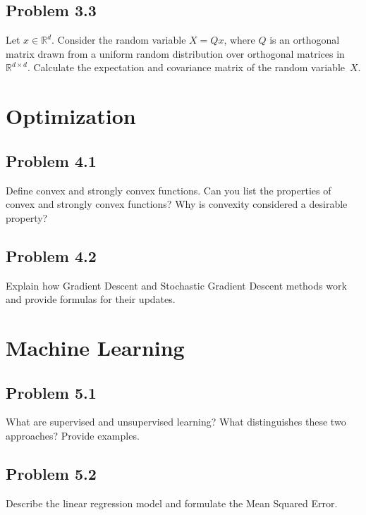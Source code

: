\documentclass{article}
\begin{document}
	\vspace{40 pt}
	
	
	\subsection*{Problem 3.3}
	
	Let $x \in \mathbb{R}^d$. Consider the random variable $X = Qx$, where $Q$ is an orthogonal matrix drawn from a uniform random distribution over orthogonal matrices in $\mathbb{R}^{d\times d} $. Calculate the expectation and covariance matrix of the random variable~$X$.
	
	\vspace{40 pt}
	
	\section{Optimization}
	
	\subsection*{Problem 4.1}
	Define convex and strongly convex functions. Can you list the properties of convex and strongly convex functions? Why is convexity considered a desirable property?
	
	\vspace{40 pt}
	
	\subsection*{Problem 4.2}
	Explain how Gradient Descent and Stochastic Gradient Descent methods work and provide formulas for their updates.
	
	\section{Machine Learning}
	\subsection*{Problem 5.1}
	What are supervised and unsupervised learning? What distinguishes these two approaches? Provide examples.
	
	\vspace{100 pt}
	
	\subsection*{Problem 5.2}
	
	Describe the linear regression model and formulate the Mean Squared Error.
	
	
\end{document}
